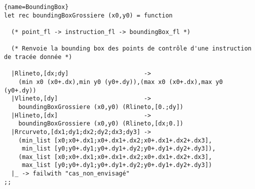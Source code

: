 \documentclass[10pt,twoside,a4paper]{article}
\begin{document}
\begin{lstlisting}{name=BoundingBox}
let rec boundingBoxGrossiere (x0,y0) = function

  (* point_fl -> instruction_fl -> boundingBox_fl *)

  (* Renvoie la bounding box des points de contrôle d'une instruction de tracée donnée *)

  |Rlineto,[dx;dy]                     ->
    (min x0 (x0+.dx),min y0 (y0+.dy)),(max x0 (x0+.dx),max y0 (y0+.dy))
  |Vlineto,[dy]                        ->
    boundingBoxGrossiere (x0,y0) (Rlineto,[0.;dy])
  |Hlineto,[dx]                        ->
    boundingBoxGrossiere (x0,y0) (Rlineto,[dx;0.])
  |Rrcurveto,[dx1;dy1;dx2;dy2;dx3;dy3] ->
    (min_list [x0;x0+.dx1;x0+.dx1+.dx2;x0+.dx1+.dx2+.dx3],
     min_list [y0;y0+.dy1;y0+.dy1+.dy2;y0+.dy1+.dy2+.dy3]),
    (max_list [x0;x0+.dx1;x0+.dx1+.dx2;x0+.dx1+.dx2+.dx3],
     max_list [y0;y0+.dy1;y0+.dy1+.dy2;y0+.dy1+.dy2+.dy3])
  |_ -> failwith "cas_non_envisagé"
;;
\end{lstlisting}
\end{document}
